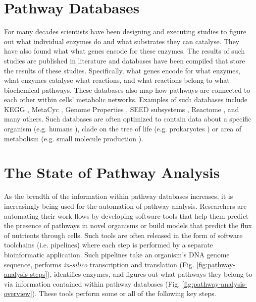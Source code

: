 \section{Pathway Databases}

For many decades scientists have been designing and executing studies to figure out what individual enzymes do and what substrates they can catalyse. They have also found what what genes encode for these enzymes. The results of such studies are published in literature and databases have been compiled that store the results of these studies. Specifically, what genes encode for what enzymes, what enzymes catalyse what reactions, and what reactions belong to what biochemical pathways. These databases also map how pathways are connected to each other within cells' metabolic networks. Examples of such databases include KEGG \cite{kanehisa2000kegg}, MetaCyc \cite{karp2002metacyc}, Genome Properties \cite{richardson2018genome}, SEED subsystems \cite{overbeek2005subsystems}, Reactome \cite{croft2013reactome}, and many others. Such databases are often optimized to contain data about a specific organism (e.g. humans \cite{croft2013reactome}), clade on the tree of life (e.g. prokaryotes \cite{richardson2018genome}) or area of metabolism (e.g. small molecule production \cite{Jewison2014}).

\section{The State of Pathway Analysis}

As the breadth of the information within pathway databases increases, it is increasingly being used for the automation of pathway analysis. Researchers are automating their work flows by developing software tools that help them predict the presence of pathways in novel organisms or build models that predict the flux of nutrients through cells. Such tools are often released in the form of software toolchains (i.e. pipelines) where each step is performed by a separate bioinformatic application. Such pipelines take an organism's DNA genome sequence, performs \textit{in-silico} transcription and translation (Fig. \ref{fig:pathway-analysis-steps}), identifies enzymes, and figures out what pathways they belong to via information contained within pathway databases (Fig. \ref{fig:pathway-analysis-overview}). These tools perform some or all of the following key steps.

